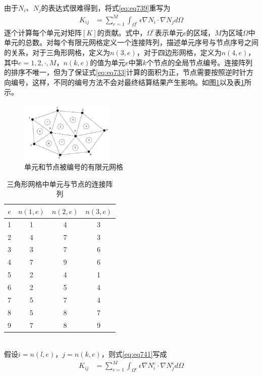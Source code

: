 \documentclass{article}
\numberwithin{equation}{section}
\begin{document}
由于$N_i$、$N_j$的表达式很难得到，将式\ref{eq:eq739}重写为
\begin{align}
    \label{eq:eq741}
    K_{ij}&=\sum^{M}_{e=1}\int_{\Omega^e}\epsilon\nabla N_i\cdot\nabla N_jd\Omega
\end{align}
逐个计算每个单元对矩阵$[K]$的贡献。式中，$\Omega^e$表示单元$e$的区域，$M$为区域$\Omega$中单元的总数。对每个有限元网格定义一个连接阵列，描述单元序号与节点序号之间的关系，对于三角形网格，定义为$n(3,e)$，对于四边形网格，定义为$n(4,e)$，其中$e=1,2,\cdot,M$，$n(k,e)$的值为单元$e$中第$k$个节点的全局节点编号。连接阵列的排序不唯一，但为了保证式\ref{eq:eq733}计算的面积为正，节点需要按照逆时针方向编号，这样，不同的编号方法不会对最终结算结果产生影响。如图\ref{fig:fig60}以及表\ref{tab:tab3}所示。
\begin{figure}[ht]
    \centering
    \includegraphics[width=0.4\textwidth]{单元和节点被编号的有限元网格.PNG}
    \caption{单元和节点被编号的有限元网格}
    \label{fig:fig60}
\end{figure}
\begin{table}[!ht]
    \centering
    \caption{三角形网格中单元与节点的连接阵列}
    \label{tab:tab3}
    \begin{tabular}{cccc}
        \toprule
        $e$ & $n(1,e)$ & $n(2,e)$ & $n(3,e)$ \\
        \midrule
        1 & 1 & 4 & 3 \\
        2 & 4 & 7 & 3 \\
        3 & 3 & 7 & 6 \\
        4 & 7 & 9 & 6 \\
        5 & 2 & 4 & 1 \\
        6 & 2 & 5 & 4 \\
        7 & 5 & 7 & 4 \\
        8 & 5 & 8 & 7 \\
        9 & 7 & 8 & 9 \\
        \bottomrule
     \end{tabular}
\end{table}
\\
假设$i=n(l,e)$，$j=n(k,e)$，则式\ref{eq:eq741}写成
\begin{align}
    \label{eq:eq742}
    K_{ij}&=\sum^{M}_{e=1}\int_{\Omega^e}\epsilon\nabla N_i^e\cdot\nabla N_j^ed\Omega
\end{align}
\end{document}
